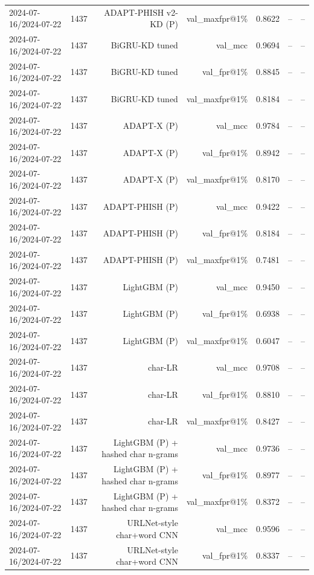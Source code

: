 \begin{table}[t]
\begin{tabular}{llrrrrr}
2024-07-16/2024-07-22 & 1437 & ADAPT-PHISH v2-KD (P) & val\_maxfpr@1\% & 0.8622 & -- & -- \\
2024-07-16/2024-07-22 & 1437 & BiGRU-KD tuned & val\_mcc & 0.9694 & -- & -- \\
2024-07-16/2024-07-22 & 1437 & BiGRU-KD tuned & val\_fpr@1\% & 0.8845 & -- & -- \\
2024-07-16/2024-07-22 & 1437 & BiGRU-KD tuned & val\_maxfpr@1\% & 0.8184 & -- & -- \\
2024-07-16/2024-07-22 & 1437 & ADAPT-X (P) & val\_mcc & 0.9784 & -- & -- \\
2024-07-16/2024-07-22 & 1437 & ADAPT-X (P) & val\_fpr@1\% & 0.8942 & -- & -- \\
2024-07-16/2024-07-22 & 1437 & ADAPT-X (P) & val\_maxfpr@1\% & 0.8170 & -- & -- \\
2024-07-16/2024-07-22 & 1437 & ADAPT-PHISH (P) & val\_mcc & 0.9422 & -- & -- \\
2024-07-16/2024-07-22 & 1437 & ADAPT-PHISH (P) & val\_fpr@1\% & 0.8184 & -- & -- \\
2024-07-16/2024-07-22 & 1437 & ADAPT-PHISH (P) & val\_maxfpr@1\% & 0.7481 & -- & -- \\
2024-07-16/2024-07-22 & 1437 & LightGBM (P) & val\_mcc & 0.9450 & -- & -- \\
2024-07-16/2024-07-22 & 1437 & LightGBM (P) & val\_fpr@1\% & 0.6938 & -- & -- \\
2024-07-16/2024-07-22 & 1437 & LightGBM (P) & val\_maxfpr@1\% & 0.6047 & -- & -- \\
2024-07-16/2024-07-22 & 1437 & char-LR & val\_mcc & 0.9708 & -- & -- \\
2024-07-16/2024-07-22 & 1437 & char-LR & val\_fpr@1\% & 0.8810 & -- & -- \\
2024-07-16/2024-07-22 & 1437 & char-LR & val\_maxfpr@1\% & 0.8427 & -- & -- \\
2024-07-16/2024-07-22 & 1437 & LightGBM (P) + hashed char n-grams & val\_mcc & 0.9736 & -- & -- \\
2024-07-16/2024-07-22 & 1437 & LightGBM (P) + hashed char n-grams & val\_fpr@1\% & 0.8977 & -- & -- \\
2024-07-16/2024-07-22 & 1437 & LightGBM (P) + hashed char n-grams & val\_maxfpr@1\% & 0.8372 & -- & -- \\
2024-07-16/2024-07-22 & 1437 & URLNet-style char+word CNN & val\_mcc & 0.9596 & -- & -- \\
2024-07-16/2024-07-22 & 1437 & URLNet-style char+word CNN & val\_fpr@1\% & 0.8337 & -- & -- \\

\end{tabular}
\end{table}

